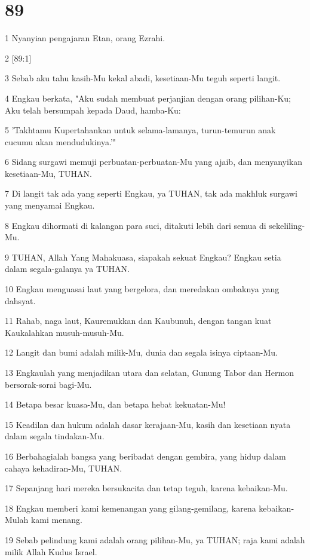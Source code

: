 \chapter{89}

\par 1 Nyanyian pengajaran Etan, orang Ezrahi.
\par 2 [89:1]
\par 3 Sebab aku tahu kasih-Mu kekal abadi, kesetiaan-Mu teguh seperti langit.
\par 4 Engkau berkata, "Aku sudah membuat perjanjian dengan orang pilihan-Ku; Aku telah bersumpah kepada Daud, hamba-Ku:
\par 5 'Takhtamu Kupertahankan untuk selama-lamanya, turun-temurun anak cucumu akan mendudukinya.'"
\par 6 Sidang surgawi memuji perbuatan-perbuatan-Mu yang ajaib, dan menyanyikan kesetiaan-Mu, TUHAN.
\par 7 Di langit tak ada yang seperti Engkau, ya TUHAN, tak ada makhluk surgawi yang menyamai Engkau.
\par 8 Engkau dihormati di kalangan para suci, ditakuti lebih dari semua di sekeliling-Mu.
\par 9 TUHAN, Allah Yang Mahakuasa, siapakah sekuat Engkau? Engkau setia dalam segala-galanya ya TUHAN.
\par 10 Engkau menguasai laut yang bergelora, dan meredakan ombaknya yang dahsyat.
\par 11 Rahab, naga laut, Kauremukkan dan Kaubunuh, dengan tangan kuat Kaukalahkan musuh-musuh-Mu.
\par 12 Langit dan bumi adalah milik-Mu, dunia dan segala isinya ciptaan-Mu.
\par 13 Engkaulah yang menjadikan utara dan selatan, Gunung Tabor dan Hermon bersorak-sorai bagi-Mu.
\par 14 Betapa besar kuasa-Mu, dan betapa hebat kekuatan-Mu!
\par 15 Keadilan dan hukum adalah dasar kerajaan-Mu, kasih dan kesetiaan nyata dalam segala tindakan-Mu.
\par 16 Berbahagialah bangsa yang beribadat dengan gembira, yang hidup dalam cahaya kehadiran-Mu, TUHAN.
\par 17 Sepanjang hari mereka bersukacita dan tetap teguh, karena kebaikan-Mu.
\par 18 Engkau memberi kami kemenangan yang gilang-gemilang, karena kebaikan-Mulah kami menang.
\par 19 Sebab pelindung kami adalah orang pilihan-Mu, ya TUHAN; raja kami adalah milik Allah Kudus Israel.
